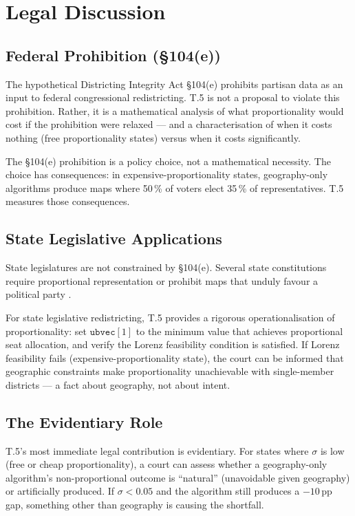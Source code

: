 \section{Legal Discussion}
\label{sec:legal}

\subsection{Federal Prohibition (\S104(e))}

The hypothetical Districting Integrity Act \S104(e) prohibits partisan data
as an input to federal congressional redistricting.
T.5 is not a proposal to violate this prohibition.
Rather, it is a mathematical analysis of what proportionality would cost if
the prohibition were relaxed --- and a characterisation of when it costs nothing
(free proportionality states) versus when it costs significantly.

The \S104(e) prohibition is a policy choice, not a mathematical necessity.
The choice has consequences: in expensive-proportionality states, geography-only
algorithms produce maps where 50\,\% of voters elect 35\,\% of representatives.
T.5 measures those consequences.

\subsection{State Legislative Applications}

State legislatures are not constrained by \S104(e).
Several state constitutions require proportional representation or prohibit
maps that unduly favour a political party \citep{lwv2018pa, harper2022nc}.

For state legislative redistricting, T.5 provides a rigorous operationalisation
of proportionality: set $\mathtt{ubvec}[1]$ to the minimum value that achieves
proportional seat allocation, and verify the Lorenz feasibility condition is
satisfied.
If Lorenz feasibility fails (expensive-proportionality state), the court can
be informed that geographic constraints make proportionality unachievable
with single-member districts --- a fact about geography, not about intent.

\subsection{The Evidentiary Role}

T.5's most immediate legal contribution is evidentiary.
For states where $\sigma$ is low (free or cheap proportionality), a court
can assess whether a geography-only algorithm's non-proportional outcome is
``natural'' (unavoidable given geography) or artificially produced.
If $\sigma < 0.05$ and the algorithm still produces a $-10$\,pp gap,
something other than geography is causing the shortfall.

